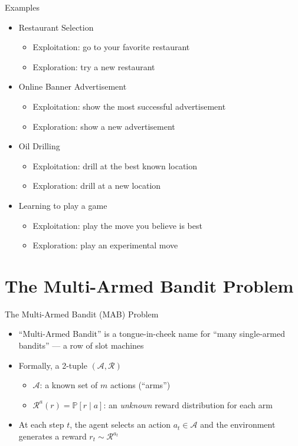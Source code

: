 \begin{frame}{Examples}
\begin{itemize}
    \item Restaurant Selection
    \begin{itemize}
        \item Exploitation: go to your favorite restaurant
        \item Exploration: try a new restaurant
    \end{itemize}
    \item Online Banner Advertisement
    \begin{itemize}
        \item Exploitation: show the most successful advertisement
        \item Exploration: show a new advertisement
    \end{itemize}
    \item Oil Drilling
    \begin{itemize}
        \item Exploitation: drill at the best known location
        \item Exploration: drill at a new location
    \end{itemize}
    \item Learning to play a game
    \begin{itemize}
        \item Exploitation: play the move you believe is best
        \item Exploration: play an experimental move
    \end{itemize}
\end{itemize}
\end{frame}

\section{The Multi-Armed Bandit Problem}
\begin{frame}{The Multi-Armed Bandit (MAB) Problem}
\begin{itemize}
    \setlength{\itemsep}{0.45em}
    \item ``Multi-Armed Bandit'' is a tongue-in-cheek name for ``many single-armed bandits'' --- a row of slot machines
    \item Formally, a 2-tuple $(\mathcal{A}, \mathcal{R})$
    \begin{itemize}
        \item $\mathcal{A}$: a known set of $m$ actions (``arms'')
        \item $\mathcal{R}^a(r) = \mathbb{P}[r \mid a]$: an \emph{unknown} reward distribution for each arm
    \end{itemize}
    \item At each step $t$, the agent selects an action $a_t \in \mathcal{A}$ and the environment generates a reward $r_t \sim \mathcal{R}^{a_t}$
\end{itemize}
\end{frame}

